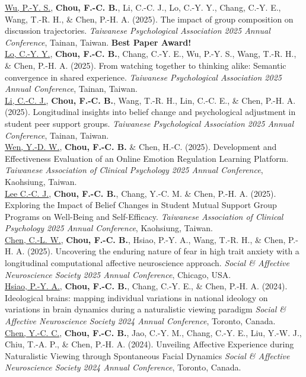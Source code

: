\documentclass[a4paper,12pt]{article}
\newcommand{\itemspace}{7pt} %
\begin{document}
\noindent \underline{Wu, P.-Y. S.}, \textbf{Chou, F.-C. B.}, Li, C.-C. J., Lo, C.-Y. Y., Chang, C.-Y. E., Wang, T.-R. H., \& Chen, P.-H. A. (2025). The impact of group composition on discussion trajectories. \textit{Taiwanese Psychological Association 2025 Annual Conference}, Tainan, Taiwan. \textbf{Best Paper Award!} \\[\itemspace]
\noindent \underline{Lo, C.-Y. Y.}, \textbf{Chou, F.-C. B.}, Chang, C.-Y. E., Wu, P.-Y. S., Wang, T.-R. H., \& Chen, P.-H. A. (2025). From watching together to thinking alike: Semantic convergence in shared experience. \textit{Taiwanese Psychological Association 2025 Annual Conference}, Tainan, Taiwan. \\[\itemspace]
\noindent \underline{Li, C.-C. J.}, \textbf{Chou, F.-C. B.}, Wang, T.-R. H., Lin, C.-C. E., \& Chen, P.-H. A. (2025). Longitudinal insights into belief change and psychological adjustment in student peer support groups. \textit{Taiwanese Psychological Association 2025 Annual Conference}, Tainan, Taiwan. \\[\itemspace]
\noindent \underline{Wen, Y.-D. W.}, \textbf{Chou, F.-C. B.} \& Chen, H.-C. (2025). Development and Effectiveness Evaluation of an Online Emotion Regulation Learning Platform. \textit{Taiwanese Association of Clinical Psychology 2025 Annual Conference}, Kaohsiung, Taiwan. \\[\itemspace]
\noindent \underline{Lee C.-C. J.}, \textbf{Chou, F.-C. B.}, Chang, Y.-C. M. \& Chen, P.-H. A. (2025). Exploring the Impact of Belief Changes in Student Mutual Support Group Programs on Well-Being and Self-Efficacy. \textit{Taiwanese Association of Clinical Psychology 2025 Annual Conference}, Kaohsiung, Taiwan. \\[\itemspace]
\noindent \underline{Chen, C.-L. W.}, \textbf{Chou, F.-C. B.}, Hsiao, P.-Y. A., Wang, T.-R. H., \& Chen, P.-H. A. (2025). Uncovering the enduring nature of fear in high trait anxiety with a longitudinal computational affective neuroscience approach. \textit{Social \& Affective Neuroscience Society 2025 Annual Conference}, Chicago, USA. \\[\itemspace]
\noindent \underline{Hsiao, P.-Y. A.}, \textbf{Chou, F.-C. B.}, Chang, C.-Y. E., \& Chen, P.-H. A. (2024). Ideological brains: mapping individual variations in national ideology on variations in brain dynamics during a naturalistic viewing paradigm \textit{Social \& Affective Neuroscience Society 2024 Annual Conference}, Toronto, Canada. \\[\itemspace]
\noindent \underline{Chen, Y.-C. C.}, \textbf{Chou, F.-C. B.}, Jao, C.-Y. M., Chang, C.-Y. E., Liu, Y.-W. J., Chiu, T.-A. P., \& Chen, P.-H. A. (2024). Unveiling Affective Experience during Naturalistic Viewing through Spontaneous Facial Dynamics \textit{Social \& Affective Neuroscience Society 2024 Annual Conference}, Toronto, Canada. \\[\itemspace]
\end{document}
